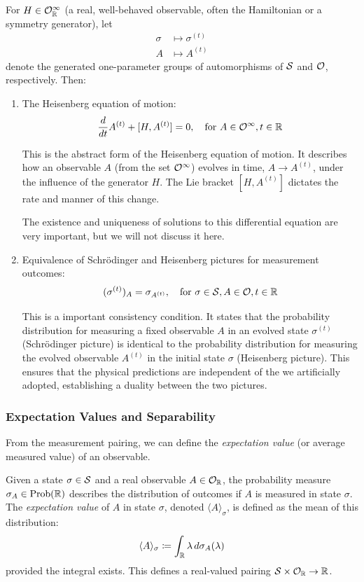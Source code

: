 For $H\in\mathcal{O}_{\mathbb{R}}^{\infty}$ (a real, well-behaved observable, often the Hamiltonian or a symmetry generator), let
\begin{align*}
    \sigma&\mapsto\sigma^{(t)} \\
    A&\mapsto A^{(t)}
\end{align*}
denote the generated one-parameter groups of automorphisms of $\mathcal{S}$ and $\mathcal{O}$, respectively. Then:

\begin{enumerate}
    \item The Heisenberg equation of motion:
    \[ \frac{d}{dt}A^{(t)}+[H,A^{(t)}]=0, \quad \text{for } A\in\mathcal{O}^{\infty}, t\in\mathbb{R} \]
    
    This is the abstract form of the Heisenberg equation of motion. It describes how an observable $A$ (from the  set $\mathcal{O}^\infty$) evolves in time, $A \to A^{(t)}$, under the influence of the generator $H$. The Lie bracket $[H, A^{(t)}]$ dictates the rate and manner of this change.
    
    The existence and uniqueness of solutions to this differential equation are very important, but we will not discuss it here.
    
    \item Equivalence of Schrödinger and Heisenberg pictures for measurement outcomes:
    \[ (\sigma^{(t)})_{A}=\sigma_{A^{(t)}}, \quad \text{for } \sigma\in \mathcal{S}, A\in\mathcal{O}, t\in\mathbb{R} \]
    
    This is a important consistency condition. It states that the probability distribution for measuring a fixed observable $A$ in an evolved state $\sigma^{(t)}$ (Schrödinger picture) is identical to the probability distribution for measuring the evolved observable $A^{(t)}$ in the initial state $\sigma$ (Heisenberg picture). This ensures that the physical predictions are independent of the  we artificially adopted, establishing a duality between the two pictures.
    
\end{enumerate}

\subsubsection{Expectation Values and Separability}

From the measurement pairing, we can define the \emph{expectation value} (or average measured value) of an observable.

\begin{definition}
Given a state $\sigma \in \mathcal{S}$ and a real observable $A \in \mathcal{O}_{\mathbb{R}}$, the probability measure $\sigma_A \in \text{Prob}(\mathbb{R})$ describes the distribution of outcomes if $A$ is measured in state $\sigma$. The \emph{expectation value} of $A$ in state $\sigma$, denoted $\langle A \rangle_{\sigma}$, is defined as the mean of this distribution:
\[ \langle A \rangle_{\sigma} \coloneqq \int_{\mathbb{R}} \lambda \, d\sigma_{A}(\lambda) \]
provided the integral exists. This defines a real-valued pairing $\mathcal{S}\times\mathcal{O}_{\mathbb{R}}\rightarrow\mathbb{R}$.
\end{definition}


